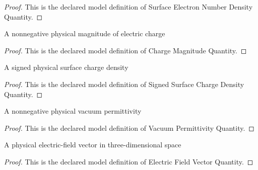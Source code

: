 \begin{proof}
  This is the declared model definition of Surface Electron Number Density Quantity.
\end{proof}
\begin{definition}
  \label{def:physics:phyx-mini-0849:phyxminiproblems-problemphyxmini0849-chargemagnitudequantity}
  A nonnegative physical magnitude of electric charge
\end{definition}
\begin{proof}
  This is the declared model definition of Charge Magnitude Quantity.
\end{proof}
\begin{definition}
  \label{def:physics:phyx-mini-0849:phyxminiproblems-problemphyxmini0849-signedsurfacechargedensityquantity}
  A signed physical surface charge density
\end{definition}
\begin{proof}
  This is the declared model definition of Signed Surface Charge Density Quantity.
\end{proof}
\begin{definition}
  \label{def:physics:phyx-mini-0849:phyxminiproblems-problemphyxmini0849-vacuumpermittivityquantity}
  A nonnegative physical vacuum permittivity
\end{definition}
\begin{proof}
  This is the declared model definition of Vacuum Permittivity Quantity.
\end{proof}
\begin{definition}
  \label{def:physics:phyx-mini-0849:phyxminiproblems-problemphyxmini0849-electricfieldvectorquantity}
  A physical electric-field vector in three-dimensional space
\end{definition}
\begin{proof}
  This is the declared model definition of Electric Field Vector Quantity.
\end{proof}
